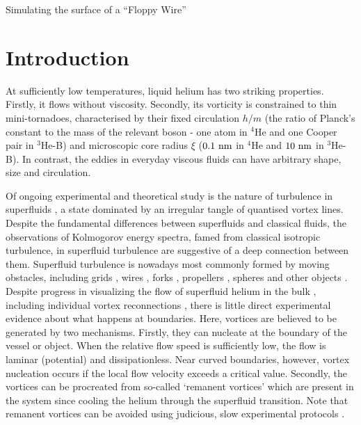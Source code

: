 \begin{chapter}{\label{cha:afm}Simulating the surface of a ``Floppy Wire''}
\section{Introduction}
At sufficiently low temperatures, liquid helium has two striking
properties.  Firstly, it flows without viscosity.  Secondly,
its vorticity is constrained to
thin mini-tornadoes, characterised by their fixed circulation
$h/m$ (the ratio of Planck's constant to
the mass of the relevant boson - one atom in $^4$He and one Cooper pair 
in $^3$He-B) and microscopic core radius $\xi$ 
($0.1~\rm nm$ in $^4$He and $10~\rm nm$ in $^3$He-B).  
In contrast, the eddies in everyday viscous fluids can have arbitrary shape, 
size and circulation.  

Of ongoing experimental and theoretical study is the nature of 
turbulence in superfluids 
\cite{Barenghi-PNAS,Bradley2011-NatPhys,Zmeev2015a,Boue2013}, a state 
dominated by an irregular tangle of quantised vortex lines.  Despite the fundamental differences between superfluids and classical fluids, the observations of Kolmogorov energy spectra, famed from classical isotropic turbulence, in superfluid turbulence \cite{Barenghi-PNAS} are suggestive of a deep connection between them.  Superfluid turbulence is nowadays most commonly formed by moving obstacles, including grids \cite{Davis2000}, wires \cite{Guenault1986,Bradley2005,Bradley2011,Fisher2001}, forks \cite{Blaauwgeers2007,Bradley2012}, propellers \cite{Tabeling1998,Salort2010}, spheres \cite{Schoepe1995} and other objects \cite{VinenSkrbek2008}.
Despite progress in visualizing the flow of superfluid helium in the
bulk \cite{Zmeev2015b,Duda2015}, including individual vortex reconnections
\cite{Lathrop}, there is little direct experimental evidence
about what happens at boundaries.
Here, 
vortices are believed to be generated by two mechanisms.  Firstly, 
they can nucleate at the boundary of the vessel or object.  
When the relative flow speed is sufficiently low, the flow is laminar 
{(potential)} and dissipationless.  
{Near curved boundaries, however, vortex nucleation occurs if
the local flow velocity exceeds a critical value.} 
Secondly, the vortices can be procreated from so-called `remanent vortices' 
which are present in the system since cooling the helium through the superfluid transition.  Note that remanent vortices can be avoided using judicious, slow experimental protocols \cite{Yano-2007}. 



\end{chapter}
